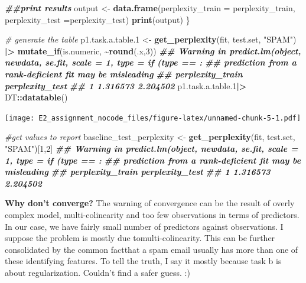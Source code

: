 \documentclass[
]{article}
\newenvironment{Shaded}{\begin{snugshade}}{\end{snugshade}}
\newcommand{\AttributeTok}[1]{\textcolor[rgb]{0.13,0.29,0.53}{#1}}
\newcommand{\CommentTok}[1]{\textcolor[rgb]{0.56,0.35,0.01}{\textit{#1}}}
\newcommand{\DecValTok}[1]{\textcolor[rgb]{0.00,0.00,0.81}{#1}}
\newcommand{\DocumentationTok}[1]{\textcolor[rgb]{0.56,0.35,0.01}{\textbf{\textit{#1}}}}
\newcommand{\FloatTok}[1]{\textcolor[rgb]{0.00,0.00,0.81}{#1}}
\newcommand{\FunctionTok}[1]{\textcolor[rgb]{0.13,0.29,0.53}{\textbf{#1}}}
\newcommand{\NormalTok}[1]{#1}
\newcommand{\OtherTok}[1]{\textcolor[rgb]{0.56,0.35,0.01}{#1}}
\newcommand{\SpecialCharTok}[1]{\textcolor[rgb]{0.81,0.36,0.00}{\textbf{#1}}}
\newcommand{\StringTok}[1]{\textcolor[rgb]{0.31,0.60,0.02}{#1}}
\begin{document}
\begin{Shaded}
\begin{Highlighting}[]
    \DocumentationTok{\#\#print results}
\NormalTok{    output }\OtherTok{\textless{}{-}} \FunctionTok{data.frame}\NormalTok{(}\AttributeTok{perplexity\_train =}\NormalTok{ perplexity\_train, }\AttributeTok{perplexity\_test =}\NormalTok{perplexity\_test)}
    \FunctionTok{print}\NormalTok{(output)}
\NormalTok{  \}}

\CommentTok{\# generate the table }
\NormalTok{p1.task.a.table}\FloatTok{.1} \OtherTok{\textless{}{-}} \FunctionTok{get\_perplexity}\NormalTok{(fit, test.set, }\StringTok{"SPAM"}\NormalTok{) }\SpecialCharTok{|\textgreater{}}
  \FunctionTok{mutate\_if}\NormalTok{(is.numeric, }\SpecialCharTok{\textasciitilde{}}\FunctionTok{round}\NormalTok{(.x,}\DecValTok{3}\NormalTok{))}
\DocumentationTok{\#\# Warning in predict.lm(object, newdata, se.fit, scale = 1, type = if (type == :}
\DocumentationTok{\#\# prediction from a rank{-}deficient fit may be misleading}
\DocumentationTok{\#\#   perplexity\_train perplexity\_test}
\DocumentationTok{\#\# 1         1.316573        2.204502}
\NormalTok{p1.task.a.table}\FloatTok{.1}\SpecialCharTok{|\textgreater{}} 
\NormalTok{  DT}\SpecialCharTok{::}\FunctionTok{datatable}\NormalTok{()}
\end{Highlighting}
\end{Shaded}

\texttt{[image: E2\_assignment\_nocode\_files/figure-latex/unnamed-chunk-5-1.pdf]}

\begin{Shaded}
\begin{Highlighting}[]

\CommentTok{\#get values to report}
\NormalTok{baseline\_test\_perplexity }\OtherTok{\textless{}{-}} \FunctionTok{get\_perplexity}\NormalTok{(fit, test.set, }\StringTok{"SPAM"}\NormalTok{)[}\DecValTok{1}\NormalTok{,}\DecValTok{2}\NormalTok{]}
\DocumentationTok{\#\# Warning in predict.lm(object, newdata, se.fit, scale = 1, type = if (type == :}
\DocumentationTok{\#\# prediction from a rank{-}deficient fit may be misleading}
\DocumentationTok{\#\#   perplexity\_train perplexity\_test}
\DocumentationTok{\#\# 1         1.316573        2.204502}
\end{Highlighting}
\end{Shaded}

\textbf{Why don't converge?} The warning of convergence can be the
result of overly complex model, multi-colinearity and too few
observations in terms of predictors. In our case, we have fairly small
number of predictors against observations. I suppose the problem is
mostly due tomulti-colinearity. This can be further consolidated by the
common factthat a spam email usually has more than one of these
identifying features. To tell the truth, I say it mostly because task b
is about regularization. Couldn't find a safer guess. :)
\end{document}
